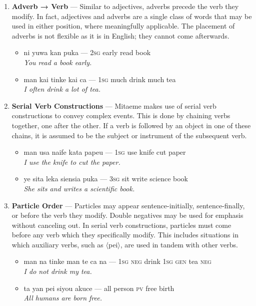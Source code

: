 \documentclass[a4paper]{article}
\begin{document}
\begin{enumerate}
	\begin{itemize}
		\item ni te pueno ca citala — \textsc{2sg} \textsc{gen} good tea cold\\\textit{Your good tea is cold.}
		\item ni te ca ke man tinke pueno — \textsc{2sg gen} tea \textsc{rel 1sg} drink good\\\textit{Your tea I am drinking is good.}
	\end{itemize}
	\item \textbf{Adverb → Verb} — Similar to adjectives, adverbs precede the verb they modify. In fact, adjectives and adverbs are a single class of words that may be used in either position, where meaningfully applicable. The placement of adverbs is not flexible as it is in English; they cannot come afterwards.
	\begin{itemize}
		\item ni yuwa kan puka — \textsc{2sg} early read book\\\textit{You read a book early.}
		\item man kai tinke kai ca — \textsc{1sg} much drink much tea\\\textit{I often drink a lot of tea.}
	\end{itemize}
	\item \textbf{Serial Verb Constructions} — Mitaeme makes use of serial verb constructions to convey complex events. This is done by chaining verbs together, one after the other. If a verb is followed by an object in one of these chains, it is assumed to be the subject or instrument of the subsequent verb.
	\begin{itemize}
		\item man usa naife kata papeu — \textsc{1sg} use knife cut paper\\\textit{I use the knife to cut the paper.}
		\item ye sita leka siensia puka — \textsc{3sg} sit write science book\\\textit{She sits and writes a scientific book.}
	\end{itemize}
	\item \textbf{Particle Order} — Particles may appear sentence-initially, sentence-finally, or before the verb they modify. Double negatives may be used for emphasis without canceling out. In serial verb constructions, particles must come before any verb which they specifically modify. This includes situations in which auxiliary verbs, such as $\langle$pei$\rangle$, are used in tandem with other verbs.
	\begin{itemize}
		\item man na tinke man te ca na — \textsc{1sg} \textsc{neg} drink \textsc{1sg} \textsc{gen} tea \textsc{neg}\\\textit{I do not drink my tea.}
		\item ta yan pei siyou akuce — all person \textsc{pv} free birth\\\textit{All humans are born free.}
	\end{itemize}
\end{enumerate}
\end{document}

